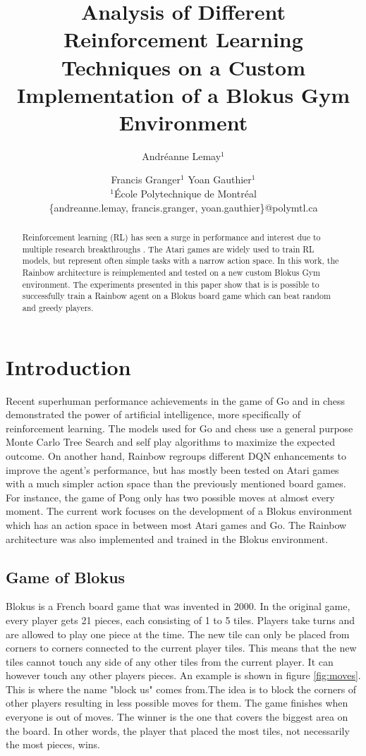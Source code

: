 \documentclass{article}
\title{ Analysis of Different Reinforcement Learning Techniques on a Custom Implementation of a Blokus Gym Environment }
\author{
Andréanne Lemay$^1$\and
Francis Granger$^1$\And
Yoan Gauthier$^1$\\
\affiliations
$^1$École Polytechnique de Montréal\\
\emails
\{andreanne.lemay, francis.granger, yoan.gauthier\}@polymtl.ca
}
\begin{document}
\maketitle


\begin{abstract}
Reinforcement learning (RL) has seen a surge in performance and interest due to multiple research
breakthroughs \cite{alphaGo}. The Atari games are widely used to train RL models, but represent often simple tasks with a narrow action space. In this work, the Rainbow architecture is reimplemented and tested on a new custom Blokus Gym environment. The experiments presented in this paper show that is is possible to successfully train a Rainbow agent on a Blokus board game which can beat random and greedy players.
\end{abstract}

\section{Introduction}
  Recent superhuman performance achievements in the game of Go \cite{alphaGo} and in chess \cite{alphaZero} demonstrated the power of artificial intelligence, more specifically of reinforcement learning. The models used for Go and chess use a general purpose Monte Carlo Tree Search and self play algorithms to maximize the expected outcome. On another hand, Rainbow \cite{rainbow} regroups different DQN enhancements to improve the agent's performance, but has mostly been tested on Atari games with a much simpler action space than the previously mentioned board games. For instance, the game of Pong only has two possible moves at almost every moment. The current work focuses on the development of a Blokus environment which has an action space in between most Atari games and Go. The Rainbow architecture was also implemented and trained in the Blokus environment.

\subsection{Game of Blokus}

Blokus is a French board game that was invented in 2000. In the original game, every player gets 21 pieces, each consisting of 1 to 5 tiles. Players take turns and are allowed to play one piece at the time. The new tile can only be placed from corners to corners connected to the current player tiles. This means that the new tiles cannot touch any side of any other tiles from the current player. It can however touch any other players pieces. An example is shown in figure \ref{fig:moves}. This is where the name "block us" comes from.The idea is to block the corners of other players resulting in less possible moves for them. The game finishes when everyone is out of moves. The winner is the one that covers the biggest area on the board. In other words, the player that placed the most tiles, not necessarily the most pieces, wins.
\end{document}
